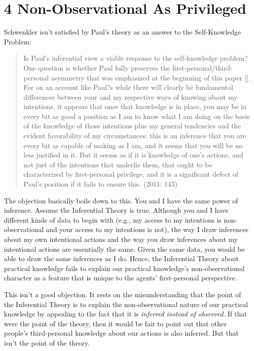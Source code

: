 \documentclass[a4paper,12pt]{article}
\begin{document}
\section*{4 Non-Observational As Privileged}
Schwenkler isn't satisfied by Paul's theory as an answer to the Self-Knowledge Problem:

\begin{quote} Is Paul's inferential view a viable response to the self-knowledge problem? One question is whether Paul fully preserves the first-personal/third-personal asymmetry that was emphasized at the beginning of this paper [\textellipsis]. For on an account like Paul?s while there will clearly be fundamental differences between your and my respective ways of knowing about my intentions, it appears that once that knowledge is in place, you may be in every bit as good a position as I am to know what I am doing on the basis of the knowledge of those intentions plus my general tendencies and the evident favorability of my circumstances: this is an inference that you are every bit as capable of making as I am, and it seems that you will be no less justified in it. But it seems as if it is knowledge of one's actions, and not just of the intentions that underlie them, that ought to be characterized by first-personal privilege, and it is a significant defect of Paul's position if it fails to ensure this. (2011: 143) \end{quote}

The objection basically boils down to this. You and I have the same power of inference. Assume the Inferential Theory is true. Although you and I have different kinds of data to begin with (e.g., my access to my intentions is non-observational and your access to my intentions is not), the way I draw inferences about my own intentional actions and the way you draw inferences about my intentional actions are essentially the same. Given the same data, you would be able to draw the same inferences as I do. Hence, the Inferential Theory about practical knowledge fails to explain our practical knowledge's non-observational character as a feature that is unique to the agents' first-personal perspective.

This isn't a good objection. It rests on the misunderstanding that the point of the Inferential Theory is to explain the non-observational nature of our practical knowledge by appealing to the fact that it is \emph{inferred instead of observed}. If that were the point of the theory, then it would be fair to point out that other people's third-personal knowledge about our actions is also inferred. But that isn't the point of the theory.
\end{document}
